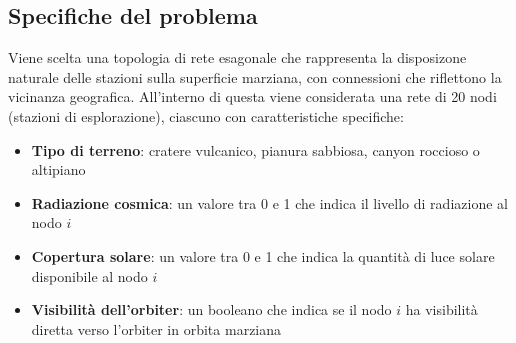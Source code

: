 \documentclass[11pt,a4paper]{article}
\begin{document}
\subsection{Specifiche del problema}
Viene scelta una topologia di rete esagonale che rappresenta la disposizone naturale delle stazioni sulla superficie marziana, con connessioni che riflettono la vicinanza geografica.
All'interno di questa viene considerata una rete di 20 nodi (stazioni di esplorazione), ciascuno con caratteristiche specifiche:
\begin{itemize}
  \item \textbf{Tipo di terreno}: cratere vulcanico, pianura sabbiosa, canyon roccioso o altipiano
  \item \textbf{Radiazione cosmica}: un valore tra 0 e 1 che indica il livello di radiazione al nodo $i$
  \item \textbf{Copertura solare}: un valore tra 0 e 1 che indica la quantità di luce solare disponibile al nodo $i$
  \item \textbf{Visibilità dell'orbiter}: un booleano che indica se il nodo $i$ ha visibilità diretta verso l'orbiter in orbita marziana
\end{itemize}
\end{document}
